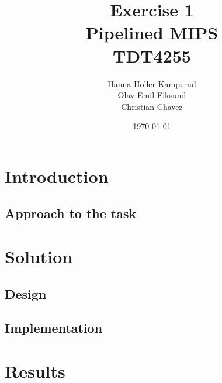 \documentclass{report}
\title{Exercise 1 \\ Pipelined MIPS \\ TDT4255} %
\author{Hanna Holler Kamperud \\ Olav Emil Eiksund \\ Christian Chavez} %
\date{\today} %
\begin{document}
\maketitle %

\newpage
\begin{abstract}

\end{abstract}

\tableofcontents


\chapter{Introduction}


\section{Approach to the task}


\chapter{Solution}


\section{Design}


\section{Implementation}


\newpage
\chapter{Results}

\end{document}
